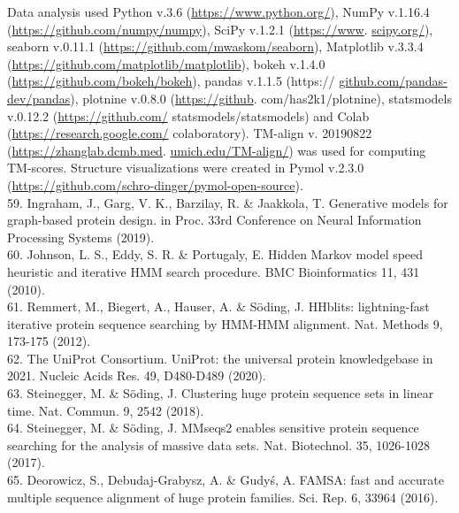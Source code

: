 \documentclass[10pt]{article}
\begin{document}
Data analysis used Python v.3.6 (\href{https://www.python.org/}{https://www.python.org/}), NumPy v.1.16.4 (\href{https://github.com/numpy/numpy}{https://github.com/numpy/numpy}), SciPy v.1.2.1 (\href{https://www}{https://www}. \href{http://scipy.org/}{scipy.org/}), seaborn v.0.11.1 (\href{https://github.com/mwaskom/seaborn}{https://github.com/mwaskom/seaborn}), Matplotlib v.3.3.4 (\href{https://github.com/matplotlib/matplotlib}{https://github.com/matplotlib/matplotlib}), bokeh v.1.4.0 (\href{https://github.com/bokeh/bokeh}{https://github.com/bokeh/bokeh}), pandas v.1.1.5 (https:// \href{http://github.com/pandas-dev/pandas}{github.com/pandas-dev/pandas}), plotnine v.0.8.0 (\href{https://github}{https://github}. com/has2k1/plotnine), statsmodels v.0.12.2 (\href{https://github.com/}{https://github.com/} statsmodels/statsmodels) and Colab (\href{https://research.google.com/}{https://research.google.com/} colaboratory). TM-align v. 20190822 (\href{https://zhanglab.dcmb.med}{https://zhanglab.dcmb.med}. \href{http://umich.edu/TM-align/}{umich.edu/TM-align/}) was used for computing TM-scores. Structure visualizations were created in Pymol v.2.3.0 (\href{https://github.com/schro-dinger/pymol-open-source}{https://github.com/schro-dinger/pymol-open-source}).\\
59. Ingraham, J., Garg, V. K., Barzilay, R. \& Jaakkola, T. Generative models for graph-based protein design. in Proc. 33rd Conference on Neural Information Processing Systems (2019).\\
60. Johnson, L. S., Eddy, S. R. \& Portugaly, E. Hidden Markov model speed heuristic and iterative HMM search procedure. BMC Bioinformatics 11, 431 (2010).\\
61. Remmert, M., Biegert, A., Hauser, A. \& Söding, J. HHblits: lightning-fast iterative protein sequence searching by HMM-HMM alignment. Nat. Methods 9, 173-175 (2012).\\
62. The UniProt Consortium. UniProt: the universal protein knowledgebase in 2021. Nucleic Acids Res. 49, D480-D489 (2020).\\
63. Steinegger, M. \& Söding, J. Clustering huge protein sequence sets in linear time. Nat. Commun. 9, 2542 (2018).\\
64. Steinegger, M. \& Söding, J. MMseqs2 enables sensitive protein sequence searching for the analysis of massive data sets. Nat. Biotechnol. 35, 1026-1028 (2017).\\
65. Deorowicz, S., Debudaj-Grabysz, A. \& Gudyś, A. FAMSA: fast and accurate multiple sequence alignment of huge protein families. Sci. Rep. 6, 33964 (2016).\\
\end{document}
